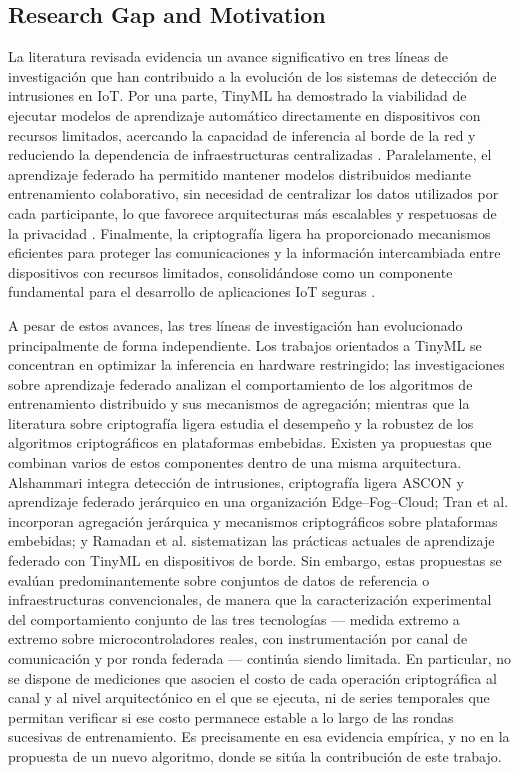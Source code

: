 \documentclass[journal,article,submit,moreauthors]{Definitions/mdpi}
\begin{document}
\subsection{Research Gap and Motivation}
La literatura revisada evidencia un avance significativo en tres líneas de investigación que han contribuido a la evolución de los sistemas de detección de intrusiones en IoT. Por una parte, TinyML ha demostrado la viabilidad de ejecutar modelos de aprendizaje automático directamente en dispositivos con recursos limitados, acercando la capacidad de inferencia al borde de la red y reduciendo la dependencia de infraestructuras centralizadas \cite{Tekin2023,Amuthadevi2025,Dini2024}. Paralelamente, el aprendizaje federado ha permitido mantener modelos distribuidos mediante entrenamiento colaborativo, sin necesidad de centralizar los datos utilizados por cada participante, lo que favorece arquitecturas más escalables y respetuosas de la privacidad \cite{McMahan2017,Imteaj2022,Hajj2023,Ramadan2025}. Finalmente, la criptografía ligera ha proporcionado mecanismos eficientes para proteger las comunicaciones y la información intercambiada entre dispositivos con recursos limitados, consolidándose como un componente fundamental para el desarrollo de aplicaciones IoT seguras \cite{NIST800232,Kaur2025,Gusita2025}.

A pesar de estos avances, las tres líneas de investigación han evolucionado principalmente de forma independiente. Los trabajos orientados a TinyML se concentran en optimizar la inferencia en hardware restringido; las investigaciones sobre aprendizaje federado analizan el comportamiento de los algoritmos de entrenamiento distribuido y sus mecanismos de agregación; mientras que la literatura sobre criptografía ligera estudia el desempeño y la robustez de los algoritmos criptográficos en plataformas embebidas. Existen ya propuestas que combinan varios de estos componentes dentro de una misma arquitectura. Alshammari \cite{Alshammari2026} integra detección de intrusiones, criptografía ligera ASCON y aprendizaje federado jerárquico en una organización Edge--Fog--Cloud; Tran et al. \cite{Tran2026} incorporan agregación jerárquica y mecanismos criptográficos sobre plataformas embebidas; y Ramadan et al. \cite{Ramadan2025} sistematizan las prácticas actuales de aprendizaje federado con TinyML en dispositivos de borde. Sin embargo, estas propuestas se evalúan predominantemente sobre conjuntos de datos de referencia o infraestructuras convencionales, de manera que la caracterización experimental del comportamiento conjunto de las tres tecnologías --- medida extremo a extremo sobre microcontroladores reales, con instrumentación por canal de comunicación y por ronda federada --- continúa siendo limitada. En particular, no se dispone de mediciones que asocien el costo de cada operación criptográfica al canal y al nivel arquitectónico en el que se ejecuta, ni de series temporales que permitan verificar si ese costo permanece estable a lo largo de las rondas sucesivas de entrenamiento. Es precisamente en esa evidencia empírica, y no en la propuesta de un nuevo algoritmo, donde se sitúa la contribución de este trabajo.
\end{document}
